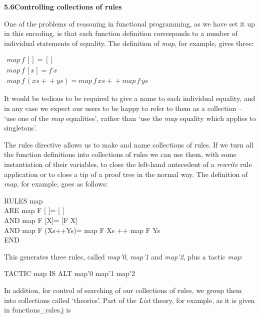 \documentclass[11pt]{book}
\newcommand{\tab}{\hspace{5mm}}
\begin{document}
\textbf{5.6\tab Controlling collections of rules}


One of the problems of reasoning in functional programming, as we have set it up in this encoding, is that each function definition corresponds to a number of individual statements of equality. The definition of \textit{map}, for example, gives three:


$ \begin{array}{l} map\,f\,[]=[] \\
map\,f\,[x]=f\,x \\
map\,f\,(xs{}+{}+{}ys)=map\,f\,xs{}+{}+{}map\,f\,ys \end{array} $

It would be tedious to be required to give a name to each individual equality, and in any case we expect our users to be happy to refer to them as a collection -- `use one of the \textit{map} equalities', rather than `use the \textit{map} equality which applies to singletons'.


The rules directive allows us to make and name collections of rules. If we turn all the function definitions into collections of rules we can use them, with some instantiation of their variables, to close the left-hand antecedent of a \textit{rewrite} rule application or to close a tip of a proof tree in the normal way. The definition of \textit{map}, for example, goes as follows:

RULES map\\
\tab ARE map F [ ]\tab = [ ]\\
\tab AND map F [X]\tab = [F X]\\
\tab AND map F (Xs++Ys)\tab = map F Xs ++ map F Ys\\
END


This generates three rules, called \textit{map'0}, \textit{map'1} and \textit{map'2}, plus a tactic \textit{map}:

TACTIC map IS ALT map'0 map'1 map'2


In addition, for control of searching of our collections of rules, we group them into collections called `theories'. Part of the \textit{List} theory, for example, as it is given in functions\_rules.j is
\end{document}
